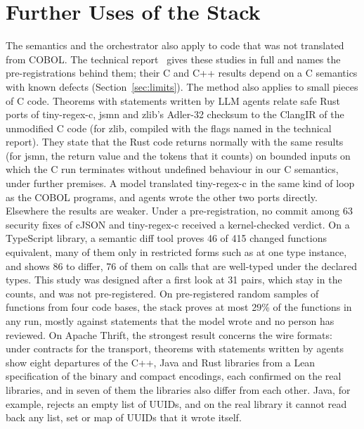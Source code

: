 \section{Further Uses of the Stack}
\label{sec:further}

The semantics and the orchestrator also apply to code that was not translated from COBOL. The technical report~\cite{fvtechreport} gives these studies in full and names the pre-registrations behind them; their C and C++ results depend on a C semantics with known defects (Section~\ref{sec:limits}).
\label{sec:c2rust}
The method also applies to small pieces of C code. Theorems with statements written by LLM agents relate safe Rust ports of tiny-regex-c, jsmn and zlib's Adler-32
checksum to the ClangIR of the unmodified C code (for zlib, compiled with the flags named in the technical report).
They state that the Rust code returns normally with the same results (for jsmn, the return value and the tokens that
it counts) on bounded inputs on which the C run terminates without undefined behaviour in our C semantics, under
further premises. A model translated tiny-regex-c in the same kind of loop as the COBOL programs, and agents wrote the other
two ports directly.
\label{sec:fixes}
\label{sec:refactor}
\label{sec:sample}
Elsewhere the results are weaker. Under a pre-registration, no commit among 63 security fixes of cJSON and
tiny-regex-c received a kernel-checked verdict. On a TypeScript library, a semantic diff tool proves 46 of 415 changed
functions equivalent, many of them only in restricted forms such as at one type instance, and shows 86 to differ, 76 of
them on calls that are well-typed under the declared types. This study was designed after a first look at 31 pairs, which stay in the counts, and
was not pre-registered. On pre-registered random
samples of functions from four code bases, the stack proves at most 29\% of the functions in any run, mostly against
statements that the model wrote and no person has reviewed.
\label{sec:thrift}
On Apache Thrift, the strongest result concerns the wire formats: under contracts for the transport, theorems with statements written by agents show eight departures of the C++, Java and Rust libraries from a Lean specification of the binary
and compact encodings, each confirmed on the real libraries, and in seven of them the libraries also differ from each
other. Java, for example, rejects an empty list of UUIDs, and on the real library it cannot read back any list, set or map of
UUIDs that it wrote itself.


